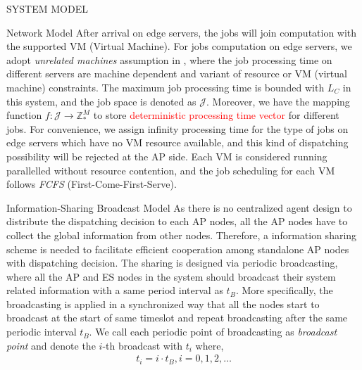 \documentclass[10pt, conference, letterpaper]{IEEEtran}
\newcommand{\domZ}{\mathbb{Z}_{*}}
\newcommand{\jSpace}{\mathcal{J}}
\begin{document}
\begin{section}{SYSTEM MODEL}
\begin{subsection}{Network Model}
            After arrival on edge servers, the jobs will join computation with the supported VM (Virtual Machine).
            For jobs computation on edge servers, we adopt \emph{unrelated machines} assumption in \cite{tan-online}, where the job processing time on different servers are machine dependent and variant of resource or VM (virtual machine) constraints.
            The maximum job processing time is bounded with $L_C$ in this system, and the job space is denoted as $\jSpace$. Moreover, we have the mapping function $f:\jSpace \to \domZ^M$ to store \textcolor{red}{deterministic processing time vector} for different jobs. For convenience, we assign infinity processing time for the type of jobs on edge servers which have no VM resource available, and this kind of dispatching possibility will be rejected at the AP side.
            Each VM is considered running parallelled without resource contention, and the job scheduling for each VM follows \emph{FCFS} (First-Come-First-Serve).
        \end{subsection}

        \begin{subsection}{Information-Sharing Broadcast Model}
            As there is no centralized agent design to distribute the dispatching decision to each AP nodes, all the AP nodes have to collect the global information from other nodes. Therefore, a information sharing scheme is needed to facilitate efficient cooperation among standalone AP nodes with dispatching decision.
            The sharing is designed via periodic broadcasting, where all the AP and ES nodes in the system should broadcast their system related information with a same period interval as $t_B$. More specifically, the broadcasting is applied in a synchronized way that all the nodes start to broadcast at the start of same timeslot and repeat broadcasting after the same periodic interval $t_B$. We call each periodic point of broadcasting as \emph{broadcast point} and denote the $i$-th broadcast with $t_i$ where,
            \begin{align}
                t_i = i \cdot t_B, i=0,1,2,\dots
            \end{align}
            

\end{subsection}
\end{section}
\end{document}
